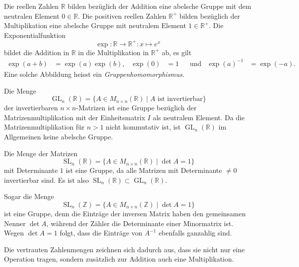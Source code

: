 \begin{beispiel}
Die reellen Zahlen $\mathbb{R}$ bilden bezüglich der Addition eine
%
abelsche Gruppe mit dem neutralen Element $0\in\mathbb{R}$.
Die positiven reellen Zahlen $\mathbb{R}^+$ bilden bezüglich der
Multiplikation eine abelsche Gruppe mit neutralem Element
$1\in\mathbb{R}^+$.
Die Exponentialfunktion
%
%
%
\[
\exp
\colon
\mathbb{R}\to\mathbb{R}^+
:
x\mapsto e^x
\]
bildet die Addition in $\mathbb{R}$ in die Multiplikation in $\mathbb{R}^+$
ab, es gilt
\begin{align*}
\exp(a+b) &= \exp(a)\exp(b),
&
\exp(0)&=1
&&\text{und}
&
\exp(a)^{-1} &= \exp(-a).
\end{align*}
Eine solche Abbildung heisst ein \emph{Gruppenhomomorphismus}.
%
%
\end{beispiel}

\begin{beispiel}
Die Menge 
\[
\operatorname{GL}_n(\mathbb{R})
=
\{
A\in M_{n\times n}(\mathbb{R})
\mid
\text{$A$ ist invertierbar}
\}
\]
der invertierbaren $n\times n$-Matrizen ist eine Gruppe bezüglich
der Matrizenmultiplikation mit der Einheitsmatrix $I$ als neutralem
Element.
%
Da die Matrizenmultiplikation für $n>1$ nicht kommutativ ist,
ist $\operatorname{GL}_n(\mathbb{R})$ im Allgemeinen keine abelsche
Gruppe.
\end{beispiel}

\begin{beispiel}
Die Menge der Matrizen
\[
\operatorname{SL}_n(\mathbb{R})
=
\{
A\in M_{n\times n}(\mathbb{R})
\mid
\det A=1
\}
\]
mit Determinante $1$ ist eine Gruppe, da alle Matrizen mit Determinante
$\ne 0$ invertierbar sind.
%
Es ist also 
$
\operatorname{SL}_n(\mathbb{R})
\subset
\operatorname{GL}_n(\mathbb{R})
$.

Sogar die Menge
\[
\operatorname{SL}_n(\mathbb{Z})
=
\{
A\in M_{n\times n}(\mathbb{Z})
\mid
\det A = 1
\}
\]
ist eine Gruppe, denn die Einträge der inversen Matrix haben den gemeinsamen
Nenner $\det A$, während der Zähler die Determinante einer Minormatrix ist.
%
Wegen $\det A=1$ folgt, dass die Einträge von $A^{-1}$ ebenfalls ganzahlig
sind.
\end{beispiel}

Die vertrauten Zahlenmengen zeichnen sich dadurch aus, dass sie nicht
nur eine Operation tragen, sondern zusätzlich zur Addition auch
eine Multiplikation.

